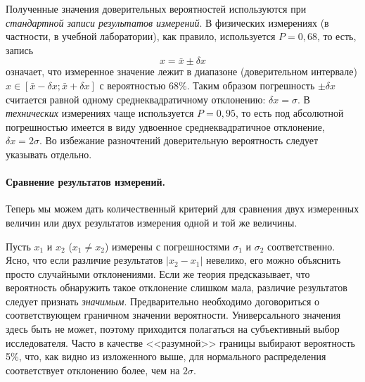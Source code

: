
Полученные значения доверительных вероятностей используются при
\emph{стандартной записи результатов измерений}. В физических измерениях
(в частности, в учебной лаборатории), как правило, используется $P=0{,}68$,
то есть, запись
\[
x=\bar{x}\pm\delta x
\]
означает, что измеренное значение лежит в диапазоне (доверительном
интервале) $x\in\left[\bar{x}-\delta x;\bar{x}+\delta x\right]$ с
вероятностью 68\%. Таким образом погрешность $\pm\delta x$ считается
равной одному среднеквадратичному отклонению: $\delta x=\sigma$.
В \emph{технических} измерениях чаще используется $P=0{,}95$, то есть под
абсолютной погрешностью имеется в виду удвоенное среднеквадратичное
отклонение, $\delta x=2\sigma$. Во избежание разночтений доверительную
вероятность следует указывать отдельно.



\paragraph{Сравнение результатов измерений.}
Теперь мы можем дать количественный критерий для сравнения двух измеренных
величин или двух результатов измерения одной и той же величины.

Пусть $x_{1}$ и $x_{2}$ ($x_{1}\ne x_{2}$) измерены с
погрешностями $\sigma_{1}$ и $\sigma_{2}$ соответственно.
Ясно, что если различие результатов $|x_2-x_1|$ невелико,
его можно объяснить просто случайными отклонениями.
Если же теория предсказывает, что вероятность обнаружить такое отклонение
слишком мала, различие результатов следует признать \emph{значимым}.
Предварительно необходимо договориться о соответствующем граничном значении
вероятности. Универсального значения здесь быть не может,
поэтому приходится полагаться на субъективный выбор исследователя. Часто
в качестве <<разумной>> границы выбирают вероятность 5\%,
что, как видно из изложенного выше, для нормального распределения
соответствует отклонению более, чем на $2\sigma$.

